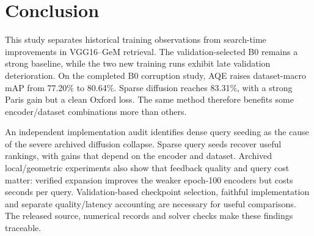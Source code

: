 \section{Conclusion}
This study separates historical training observations from search-time improvements in VGG16--GeM retrieval. The validation-selected B0 remains a strong baseline, while the two new training runs exhibit late validation deterioration. On the completed B0 corruption study, AQE raises dataset-macro mAP from 77.20\% to 80.64\%. Sparse diffusion reaches 83.31\%, with a strong Paris gain but a clean Oxford loss. The same method therefore benefits some encoder/dataset combinations more than others.

An independent implementation audit identifies dense query seeding as the cause of the severe archived diffusion collapse. Sparse query seeds recover useful rankings, with gains that depend on the encoder and dataset. Archived local/geometric experiments also show that feedback quality and query cost matter: verified expansion improves the weaker epoch-100 encoders but costs seconds per query. Validation-based checkpoint selection, faithful implementation and separate quality/latency accounting are necessary for useful comparisons. The released source, numerical records and solver checks make these findings traceable.
